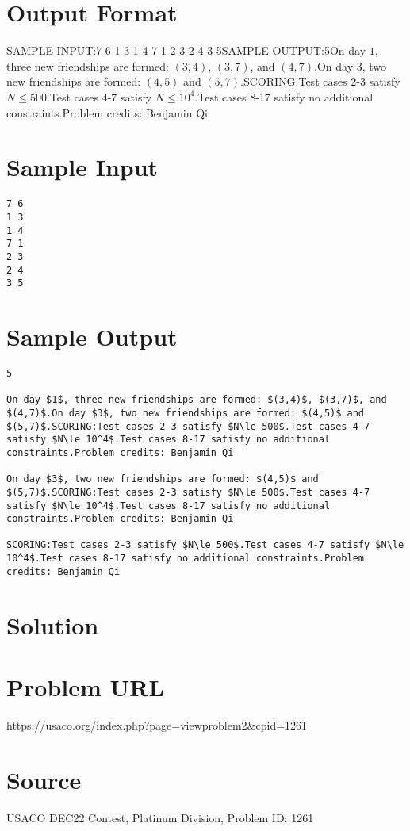 \documentclass[12pt]{article}
\begin{document}
\section*{Output Format}
SAMPLE INPUT:7 6
1 3
1 4
7 1
2 3
2 4
3 5SAMPLE OUTPUT:5On day $1$, three new friendships are formed: $(3,4)$, $(3,7)$, and $(4,7)$.On day $3$, two new friendships are formed: $(4,5)$ and $(5,7)$.SCORING:Test cases 2-3 satisfy $N\le 500$.Test cases 4-7 satisfy $N\le 10^4$.Test cases 8-17 satisfy no additional constraints.Problem credits: Benjamin Qi

\section*{Sample Input}
\begin{verbatim}
7 6
1 3
1 4
7 1
2 3
2 4
3 5
\end{verbatim}

\section*{Sample Output}
\begin{verbatim}
5

On day $1$, three new friendships are formed: $(3,4)$, $(3,7)$, and $(4,7)$.On day $3$, two new friendships are formed: $(4,5)$ and $(5,7)$.SCORING:Test cases 2-3 satisfy $N\le 500$.Test cases 4-7 satisfy $N\le 10^4$.Test cases 8-17 satisfy no additional constraints.Problem credits: Benjamin Qi

On day $3$, two new friendships are formed: $(4,5)$ and $(5,7)$.SCORING:Test cases 2-3 satisfy $N\le 500$.Test cases 4-7 satisfy $N\le 10^4$.Test cases 8-17 satisfy no additional constraints.Problem credits: Benjamin Qi

SCORING:Test cases 2-3 satisfy $N\le 500$.Test cases 4-7 satisfy $N\le 10^4$.Test cases 8-17 satisfy no additional constraints.Problem credits: Benjamin Qi
\end{verbatim}

\section*{Solution}


\section*{Problem URL}
https://usaco.org/index.php?page=viewproblem2&cpid=1261

\section*{Source}
USACO DEC22 Contest, Platinum Division, Problem ID: 1261
\end{document}
